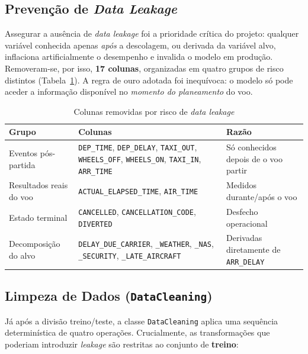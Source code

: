 \documentclass[conference]{IEEEtran}
\begin{document}
\subsection{Prevenção de \textit{Data Leakage}}
Assegurar a ausência de \textit{data leakage} foi a prioridade crítica do
projeto: qualquer variável conhecida apenas \emph{após} a descolagem, ou
derivada da variável alvo, inflaciona artificialmente o desempenho e invalida o
modelo em produção. Removeram-se, por isso, \textbf{17 colunas}, organizadas em
quatro grupos de risco distintos (Tabela~\ref{tab:leakage}). A regra de ouro
adotada foi inequívoca: o modelo só pode aceder a informação disponível no
\emph{momento do planeamento} do voo.

\begin{table}[h]
\centering
\caption{Colunas removidas por risco de \textit{data leakage}}
\label{tab:leakage}
\setlength{\tabcolsep}{3pt}
\begin{tabular}{p{2.05cm}p{3.5cm}p{1.6cm}}
\toprule
\textbf{Grupo} & \textbf{Colunas} & \textbf{Razão} \\
\midrule
Eventos pós-partida & \texttt{DEP\_TIME}, \texttt{DEP\_DELAY},
\texttt{TAXI\_OUT}, \texttt{WHEELS\_OFF}, \texttt{WHEELS\_ON},
\texttt{TAXI\_IN}, \texttt{ARR\_TIME} & Só conhecidos depois de o voo partir \\
\midrule
Resultados reais do voo & \texttt{ACTUAL\_ELAPSED\_TIME}, \texttt{AIR\_TIME} &
Medidos durante/após o voo \\
\midrule
Estado terminal & \texttt{CANCELLED}, \texttt{CANCELLATION\_CODE},
\texttt{DIVERTED} & Desfecho operacional \\
\midrule
Decomposição do alvo & \texttt{DELAY\_DUE\_CARRIER}, \texttt{\_WEATHER},
\texttt{\_NAS}, \texttt{\_SECURITY}, \texttt{\_LATE\_AIRCRAFT} & Derivadas
diretamente de \texttt{ARR\_DELAY} \\
\bottomrule
\end{tabular}
\end{table}

\subsection{Limpeza de Dados (\texttt{DataCleaning})}
Já após a divisão treino/teste, a classe \texttt{DataCleaning} aplica uma
sequência determinística de quatro operações. Crucialmente, as transformações
que poderiam introduzir \textit{leakage} são restritas ao conjunto de
\textbf{treino}:
\end{document}

